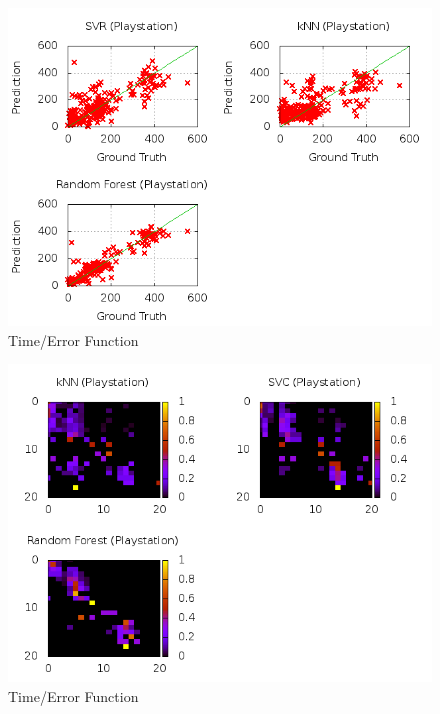 \begin{figure}
\centering
\includegraphics[scale=0.55]{images/plots/machine_learning/playstation/true_pred_playstation.png}
\caption{Time/Error Function}
\label{crowdsourcing_desc_length}
\end{figure}
\begin{figure}
\centering
\includegraphics[scale=0.55]{images/plots/machine_learning/playstation/conf_mat_playstation.png}
\caption{Time/Error Function}
\label{crowdsourcing_desc_length}
\end{figure}
